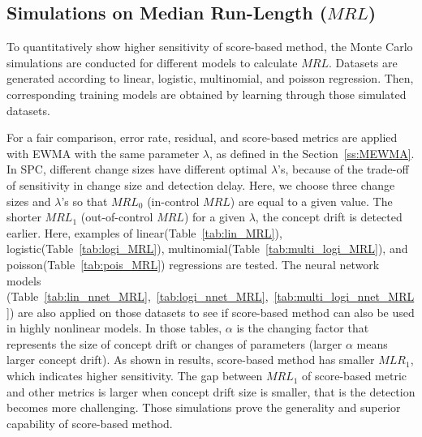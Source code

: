 \documentclass[twoside,11pt]{article}
\begin{document}
\subsection{Simulations on Median Run-Length ($MRL$)}
\label{ss:simu_MRL}
To quantitatively show higher sensitivity of score-based method, the Monte Carlo simulations are conducted for different models to calculate $MRL$. Datasets are generated according to linear, logistic, multinomial, and poisson regression. Then, corresponding training models are obtained by learning through those simulated datasets.

For a fair comparison, error rate, residual, and score-based metrics are applied with EWMA with the same parameter $\lambda$, as defined in the Section~\ref{ss:MEWMA}. In SPC, different change sizes have different optimal $ \lambda$'s, because of the trade-off of sensitivity in change size and detection delay. Here, we choose three change sizes and $ \lambda$'s so that $MRL_0$ (in-control $MRL$) are equal to a given value. The shorter $MRL_1$ (out-of-control $MRL$) for a given $ \lambda$, the concept drift is detected earlier. Here, examples of linear(Table~\ref{tab:lin_MRL}), logistic(Table~\ref{tab:logi_MRL}), multinomial(Table~\ref{tab:multi_logi_MRL}), and poisson(Table~\ref{tab:pois_MRL}) regressions are tested. The neural network models (Table~\ref{tab:lin_nnet_MRL},~\ref{tab:logi_nnet_MRL},~\ref{tab:multi_logi_nnet_MRL}) are also applied on those datasets to see if score-based method can also be used in highly nonlinear models. In those tables, $ \alpha$ is the changing factor that represents the size of concept drift or changes of parameters (larger $ \alpha$ means larger concept drift). As shown in results, score-based method has smaller $MLR_1$, which indicates higher sensitivity. The gap between $MRL_1$ of score-based metric and other metrics is larger when concept drift size is smaller, that is the detection becomes more challenging. Those simulations prove the generality and superior capability of score-based method.
\end{document}
